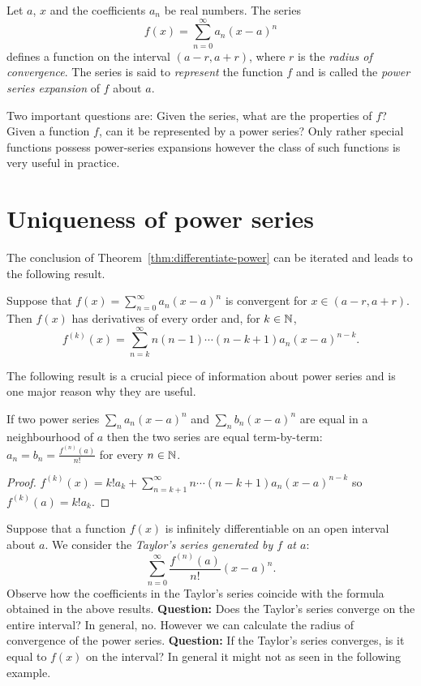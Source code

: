 Let \(a\), \(x\) and the coefficients \(a_n\) be real numbers.
The series
\[
  f(x) = \sum_{n=0}^{\infty} a_n (x-a)^n
\]
defines a function on the interval \((a-r,a+r)\),
where  \(r\)  is the \emph{radius of convergence}.
%
The series is said to \emph{represent} the function \(f\)
and is called the \emph{power series expansion} of \(f\) about \(a\).

Two important questions are: Given the series, what are the properties of \(f\)?
Given a function \(f\), can it be represented by a power series?
Only rather special functions possess power-series expansions however the class of such functions is very useful in practice.



\section{Uniqueness of power series}

The conclusion of Theorem~\ref{thm:differentiate-power} can be iterated and leads to the following result.

\begin{theorem}
  Suppose that \(f(x) = \sum_{n=0}^{\infty} a_n (x-a)^n\) is convergent for \(x\in (a-r,a+r)\).
  Then \(f(x)\) has derivatives of every order and, for \(k\in \mathbb{N}\),
  \[
    f^{(k)}(x) =\sum_{n=k}^{\infty} n(n-1)\cdots (n-k+1) a_n(x-a)^{n-k}.
  \]
\end{theorem}

The following result is a crucial piece of information about power series and is one major reason why they are useful.

\begin{theorem}
  \label{thm:unique-power}
  If two power series \(\sum_n a_n(x-a)^n\) and  \(\sum_n b_n(x-a)^n\) are equal in a neighbourhood of \(a\) then the two series are equal term-by-term:
  \(a_n = b_n = \frac{f^{(n)}(a)}{n!}\) for every \(n\in \mathbb{N}\).
\end{theorem}

\begin{proof}
  \(f^{(k)}(x) = k! a_k + \displaystyle\sum_{n=k+1}^{\infty} n\cdots (n-k+1) a_n(x-a)^{n-k}\)
  so \(f^{(k)}(a) = k! a_k \).
\end{proof}


Suppose that a function \(f(x)\) is infinitely differentiable on an open interval about \(a\).
We consider the \emph{Taylor's series generated by \(f\) at \(a\)}:
\[
  \sum_{n=0}^{\infty} \frac{f^{(n)}(a)}{n!} (x-a)^{n}.
\]
Observe how the coefficients in the Taylor's series coincide with the formula obtained in the above results.
\textbf{Question:}
Does the Taylor's series converge on the entire interval?
In general, no. However we can calculate the radius of convergence of the power series.
\textbf{Question:}
If the Taylor's series converges, is it equal to \(f(x)\) on the interval?
{In general it might not as seen in the following example.}

